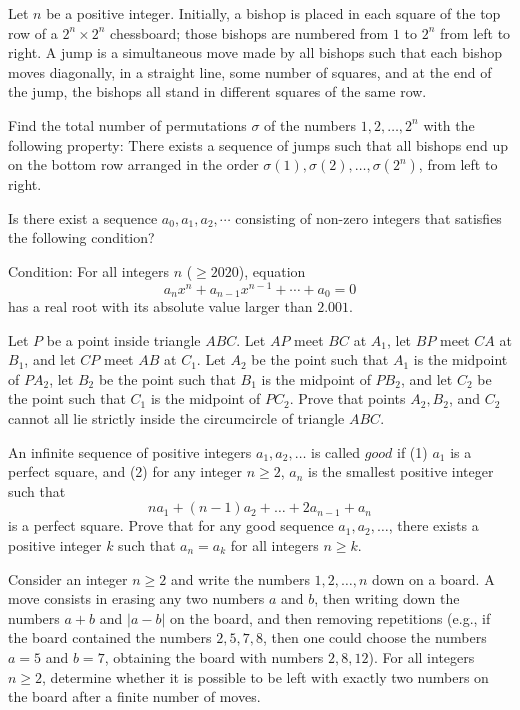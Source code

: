 \documentclass[11pt]{scrartcl}
\begin{document}
\begin{problem}[7427384519403100799]
Let $n$ be a positive integer. Initially, a bishop is placed in each square of the top row of a $2^n \times 2^n$
chessboard; those bishops are numbered from $1$ to $2^n$ from left to right. A jump is a simultaneous move made by all bishops such that each bishop moves diagonally, in a straight line, some number of squares, and at the end of the jump, the bishops all stand in different squares of the same row.

Find the total number of permutations $\sigma$ of the numbers $1, 2, \ldots, 2^n$ with the following property: There exists a sequence of jumps such that all bishops end up on the bottom row arranged in the order $\sigma(1), \sigma(2), \ldots, \sigma(2^n)$, from left to right.
\end{problem}
\begin{problem}[637496989440645]
Is there exist a sequence $a_0,a_1,a_2,\cdots $ consisting of non-zero integers that satisfies the following condition?

Condition: For all integers $n$ ($\ge 2020$), equation
$$a_n x^n+a_{n-1}x^{n-1}+\cdots +a_0=0$$has a real root with its absolute value larger than $2.001$.
\end{problem}
\begin{problem}[3245291910836201005]
	Let $P$ be a point inside triangle $ABC$. Let $AP$ meet $BC$ at $A_1$, let $BP$ meet $CA$ at $B_1$, and let $CP$ meet $AB$ at $C_1$. Let $A_2$ be the point such that $A_1$ is the midpoint of $PA_2$, let $B_2$ be the point such that $B_1$ is the midpoint of $PB_2$, and let $C_2$ be the point such that $C_1$ is the midpoint of $PC_2$. Prove that points $A_2, B_2$, and $C_2$ cannot all lie strictly inside the circumcircle of triangle $ABC$.
\end{problem}
\begin{problem}[5458049157791318449]
	An infinite sequence of positive integers $a_1, a_2, \dots$ is called $good$ if
(1) $a_1$ is a perfect square, and
(2) for any integer $n \ge 2$, $a_n$ is the smallest positive integer such that$$na_1 + (n-1)a_2 + \dots + 2a_{n-1} + a_n$$is a perfect square.
Prove that for any good sequence $a_1, a_2, \dots$, there exists a positive integer $k$ such that $a_n=a_k$ for all integers $n \ge k$.
\end{problem}
\begin{problem}[2566019241385820279]
	Consider an integer \(n \ge 2\) and write the numbers \(1, 2,  \ldots, n\) down on a board. A move consists in erasing any two numbers \(a\) and \(b\), then writing down the numbers \(a+b\) and \(\vert a-b \vert\) on the board, and then removing repetitions (e.g., if the board contained the numbers \(2, 5, 7, 8\), then one could choose the numbers \(a = 5\) and \(b = 7\), obtaining the board with numbers \(2, 8, 12\)). For all integers \(n \ge 2\), determine whether it is possible to be left with exactly two numbers on the board after a finite number of moves.
\end{problem}
\end{document}
